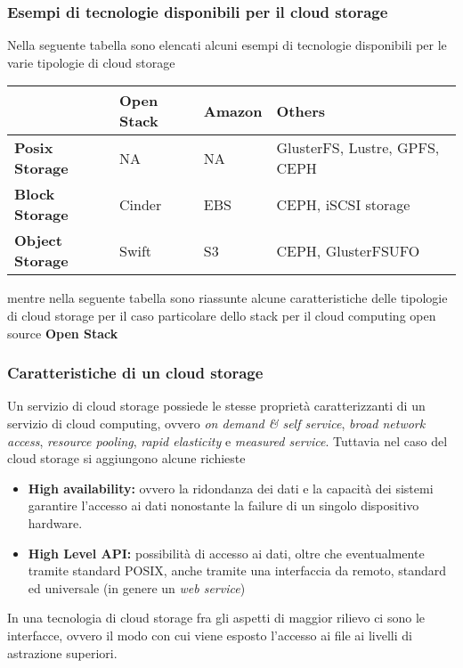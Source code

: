 \documentclass[italian,]{article}
\providecommand{\tightlist}{%
  \setlength{\itemsep}{0pt}\setlength{\parskip}{0pt}}
\begin{document}
\subsubsection{Esempi di tecnologie disponibili per il cloud
storage}\label{esempi-di-tecnologie-disponibili-per-il-cloud-storage}

Nella seguente tabella sono elencati alcuni esempi di tecnologie
disponibili per le varie tipologie di cloud storage

\begin{longtable}[]{@{}llll@{}}
\toprule
& \textbf{Open Stack} & \textbf{Amazon} & \textbf{Others}\tabularnewline
\midrule
\endhead
\textbf{Posix Storage} & NA & NA & GlusterFS, Lustre, GPFS,
CEPH\tabularnewline
\textbf{Block Storage} & Cinder & EBS & CEPH, iSCSI
storage\tabularnewline
\textbf{Object Storage} & Swift & S3 & CEPH, GlusterFSUFO\tabularnewline
\bottomrule
\end{longtable}

mentre nella seguente tabella sono riassunte alcune caratteristiche
delle tipologie di cloud storage per il caso particolare dello stack per
il cloud computing open source \textbf{Open Stack}

\subsubsection{Caratteristiche di un cloud
storage}\label{caratteristiche-di-un-cloud-storage}

Un servizio di cloud storage possiede le stesse proprietà
caratterizzanti di un servizio di cloud computing, ovvero \emph{on
demand \& self service}, \emph{broad network access}, \emph{resource
pooling}, \emph{rapid elasticity} e \emph{measured service}. Tuttavia
nel caso del cloud storage si aggiungono alcune richieste

\begin{itemize}
\tightlist
\item
  \textbf{High availability:} ovvero la ridondanza dei dati e la
  capacità dei sistemi garantire l'accesso ai dati nonostante la failure
  di un singolo dispositivo hardware.
\item
  \textbf{High Level API:} possibilità di accesso ai dati, oltre che
  eventualmente tramite standard POSIX, anche tramite una interfaccia da
  remoto, standard ed universale (in genere un \emph{web service})
\end{itemize}

In una tecnologia di cloud storage fra gli aspetti di maggior rilievo ci
sono le interfacce, ovvero il modo con cui viene esposto l'accesso ai
file ai livelli di astrazione superiori.
\end{document}
